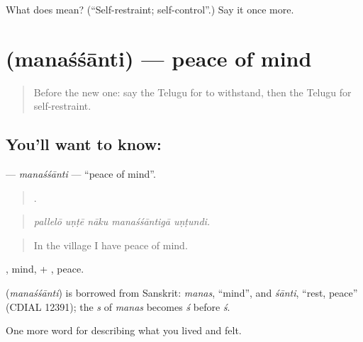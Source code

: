 \begin{tcolorbox}[breakable,colback=teal!4,colframe=teal!35!black,title={Before you move on}]
What does  mean? (\textquotedblleft{}Self-restraint; self-control\textquotedblright{}.) Say it once more.
\end{tcolorbox}
\section[\texorpdfstring{\te{మనశ్శాంతి} (manaśśānti)}{మనశ్శాంతి (manaśśānti)}]{ (manaśśānti) — peace of mind}

\label{lesson:TE-C506-manassanti}



\begin{quote}
Before the new one: say the Telugu for to withstand, then the Telugu for self-restraint.
\end{quote}

\subsection*{You'll want to know: }
\textbf{} — \emph{manaśśānti} — \textquotedblleft{}peace of mind\textquotedblright{}.

\begin{quote}
    .
\end{quote}

\begin{quote}
\emph{pallelō uṇṭē nāku manaśśāntigā uṇṭundi.}
\end{quote}

\begin{quote}
In the village I have peace of mind.
\end{quote}

, mind, + , peace.

\begin{cousinweb}
\textbf{} (\emph{manaśśānti}) is borrowed from Sanskrit: \emph{manas}, \textquotedblleft{}mind\textquotedblright{}, and \emph{śānti}, \textquotedblleft{}rest, peace\textquotedblright{} (CDIAL 12391); the \emph{s} of \emph{manas} becomes \emph{ś} before \emph{ś}.
\end{cousinweb}

\begin{grammarlens}[title={What you've built}]
One more word for describing what you lived and felt.
\end{grammarlens}

